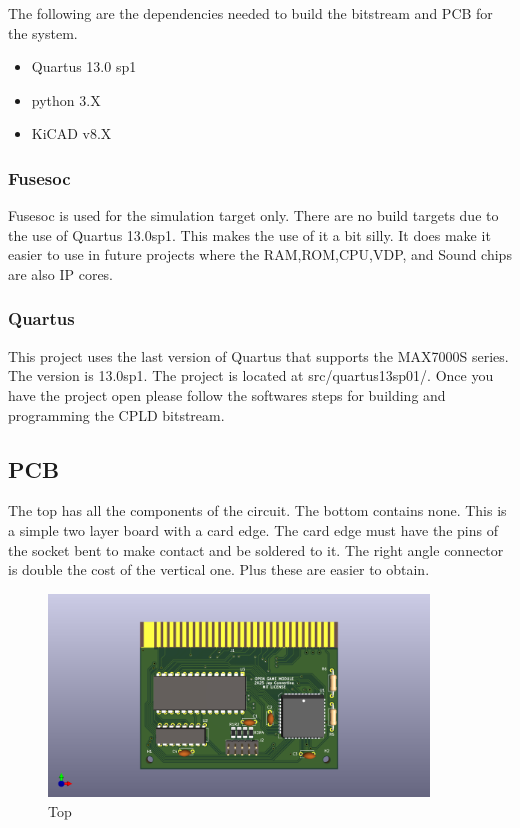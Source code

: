 \par
The following are the dependencies needed to build the bitstream and PCB for the system.

\begin{itemize}
  \item Quartus 13.0 sp1
  \item python 3.X
  \item KiCAD v8.X
\end{itemize}



\subsubsection{Fusesoc}
\par
Fusesoc is used for the simulation target only. There are no build targets due to the use of Quartus 13.0sp1.
This makes the use of it a bit silly. It does make it easier to use in future projects where the RAM,ROM,CPU,VDP,
and Sound chips are also IP cores.



\subsubsection{Quartus}
\par
This project uses the last version of Quartus that supports the MAX7000S series. The version is 13.0sp1.
The project is located at src/quartus13sp01/. Once you have the project open please follow the softwares steps
for building and programming the CPLD bitstream.

\subsection{PCB}

\par
The top has all the components of the circuit. The bottom contains none. This is a simple two layer board with a card edge. The card edge must have the pins of the socket bent to make contact and be soldered to it. The right angle connector is double the cost of the vertical one. Plus these are easier to obtain.

\begin{figure}[h!]
\caption{Top}
\centering
\includegraphics[width=0.90\textwidth,keepaspectratio]{img/ogm_top.png}
\end{figure}

